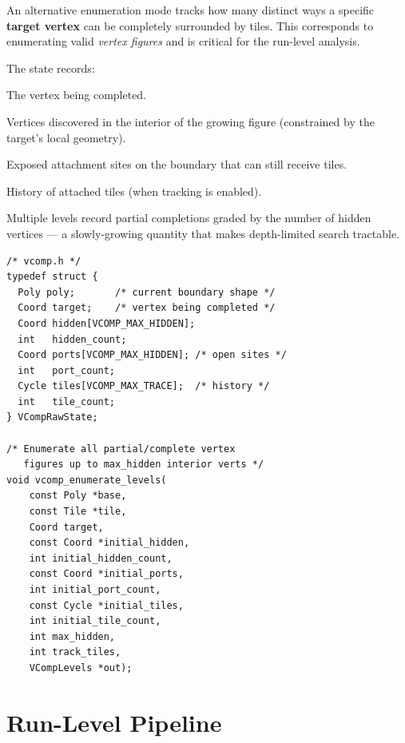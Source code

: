 \documentclass[10pt,a4paper]{article}
\newcommand{\code}[1]{\texttt{\small #1}}
\newcommand{\file}[1]{\texttt{\footnotesize #1}}
\begin{document}
\begin{tcolorbox}[dualbox, title=Vertex-Completion Enumeration — \file{src/throughput/vcomp.h}]
  An alternative enumeration mode tracks how many distinct ways a
  specific \textbf{target vertex} can be completely surrounded by
  tiles.  This corresponds to enumerating valid \emph{vertex figures}
  and is critical for the run-level analysis.

  The state records:
  \begin{description}[leftmargin=0pt]
    \item[\code{target}] The vertex being completed.
    \item[\code{hidden}] Vertices discovered in the interior of the
      growing figure (constrained by the target's local geometry).
    \item[\code{ports}] Exposed attachment sites on the boundary that
      can still receive tiles.
    \item[\code{tiles}] History of attached tiles (when tracking is
      enabled).
  \end{description}

  Multiple levels record partial completions graded by the number of
  hidden vertices — a slowly-growing quantity that makes depth-limited
  search tractable.
\tcblower
\begin{verbatim}
/* vcomp.h */
typedef struct {
  Poly poly;       /* current boundary shape */
  Coord target;    /* vertex being completed */
  Coord hidden[VCOMP_MAX_HIDDEN];
  int   hidden_count;
  Coord ports[VCOMP_MAX_HIDDEN]; /* open sites */
  int   port_count;
  Cycle tiles[VCOMP_MAX_TRACE];  /* history */
  int   tile_count;
} VCompRawState;

/* Enumerate all partial/complete vertex
   figures up to max_hidden interior verts */
void vcomp_enumerate_levels(
    const Poly *base,
    const Tile *tile,
    Coord target,
    const Coord *initial_hidden,
    int initial_hidden_count,
    const Coord *initial_ports,
    int initial_port_count,
    const Cycle *initial_tiles,
    int initial_tile_count,
    int max_hidden,
    int track_tiles,
    VCompLevels *out);
\end{verbatim}
\end{tcolorbox}

\section{Run-Level Pipeline}
\end{document}
